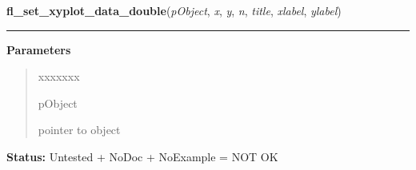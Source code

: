     \label{xformslib:library:fl_set_xyplot_data_double}

    \vspace{0.5ex}

\hspace{.8\funcindent}\begin{boxedminipage}{\funcwidth}

    \raggedright \textbf{fl\_set\_xyplot\_data\_double}(\textit{pObject}, \textit{x}, \textit{y}, \textit{n}, \textit{title}, \textit{xlabel}, \textit{ylabel})

    \vspace{-1.5ex}

    \rule{\textwidth}{0.5\fboxrule}
\setlength{\parskip}{2ex}
\setlength{\parskip}{1ex}
      \textbf{Parameters}
      \vspace{-1ex}

      \begin{quote}
        \begin{Ventry}{xxxxxxx}

          \item[pObject]

          pointer to object

        \end{Ventry}

      \end{quote}

\textbf{Status:} Untested + NoDoc + NoExample = NOT OK



    \end{boxedminipage}

    \label{xformslib:library:fl_set_xyplot_file}

    \vspace{0.5ex}

